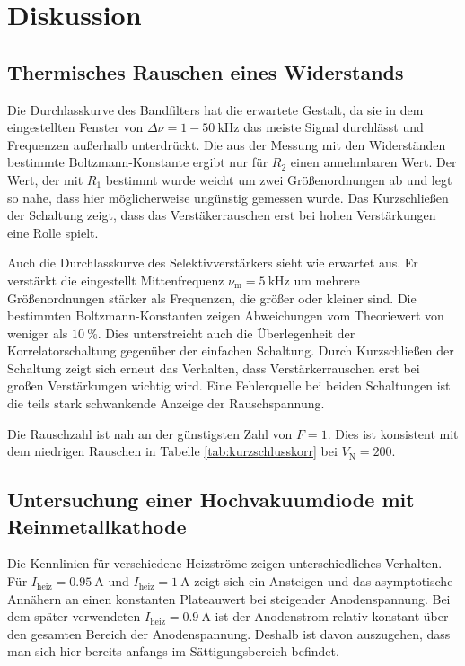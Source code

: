 \section{Diskussion}
\label{sec:Diskussion}

\subsection{Thermisches Rauschen eines Widerstands}

Die Durchlasskurve des Bandfilters hat die erwartete Gestalt, da sie in dem eingestellten Fenster von $\Delta \nu = 1-\SI{50}{\kilo\hertz}$ das meiste Signal durchlässt und Frequenzen außerhalb unterdrückt.
Die aus der Messung mit den Widerständen bestimmte Boltzmann-Konstante ergibt nur für $R_2$ einen annehmbaren Wert. Der Wert, der mit $R_1$ bestimmt wurde weicht um zwei Größenordnungen ab und legt so nahe, dass hier möglicherweise ungünstig gemessen wurde.
Das Kurzschließen der Schaltung zeigt, dass das Verstäkerrauschen erst bei hohen Verstärkungen eine Rolle spielt.

Auch die Durchlasskurve des Selektivverstärkers sieht wie erwartet aus. Er verstärkt die eingestellt Mittenfrequenz $\nu_\text{m} = \SI{5}{\kilo\hertz}$ um mehrere Größenordnungen stärker als Frequenzen, die größer oder kleiner sind.
Die bestimmten Boltzmann-Konstanten zeigen Abweichungen vom Theoriewert von weniger als $\SI{10}{\percent}$. Dies unterstreicht auch die Überlegenheit der Korrelatorschaltung gegenüber der einfachen Schaltung. Durch Kurzschließen der Schaltung zeigt sich erneut das Verhalten, dass Verstärkerrauschen erst bei großen Verstärkungen wichtig wird.
Eine Fehlerquelle bei beiden Schaltungen ist die teils stark schwankende Anzeige der Rauschspannung.

Die Rauschzahl ist nah an der günstigsten Zahl von $F = 1$. Dies ist konsistent mit dem niedrigen Rauschen in Tabelle \ref{tab:kurzschlusskorr} bei $V_\text{N} = 200$.

\subsection{Untersuchung einer Hochvakuumdiode mit Reinmetallkathode}

Die Kennlinien für verschiedene Heizströme zeigen unterschiedliches Verhalten. Für $I_\text{heiz} = \SI{0.95}{\ampere}$ und $I_\text{heiz} = \SI{1}{\ampere}$ zeigt sich ein Ansteigen und das asymptotische Annähern an einen konstanten Plateauwert bei steigender Anodenspannung. Bei dem später verwendeten $I_\text{heiz} = \SI{0.9}{\ampere}$ ist der Anodenstrom relativ konstant über den gesamten Bereich der Anodenspannung. Deshalb ist davon auszugehen, dass man sich hier bereits anfangs im Sättigungsbereich befindet.

